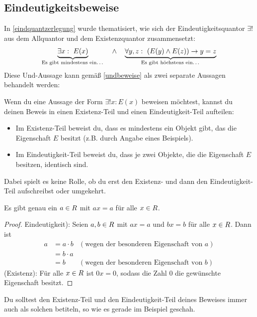 \subsection*{Eindeutigkeitsbeweise}


In \cref{eindquantzerlegung} wurde thematisiert, wie sich der Eindeutigkeitsquantor $\exists !$ aus dem Allquantor und dem Existenzquantor zusammensetzt:
    \[ \underbrace{\exists x:\ E(x)}_{\text{Es gibt mindestens ein\dots}}\quad \land\quad \underbrace{\forall y,z:\ (E(y)\land E(z)) \to y=z}_{\text{Es gibt höchstens ein\dots}}\]
Diese Und-Aussage kann gemäß \cref{undbeweise} als zwei separate Aussagen behandelt werden:


\begin{axiom} \label{eindbeweis} 
    Wenn du eine Aussage der Form $\exists ! x: E(x)$ beweisen möchtest, kannst du deinen Beweis in einen Existenz-Teil und einen Eindeutigkeit-Teil aufteilen:
    \begin{itemize}
        \item Im Existenz-Teil beweist du, dass es mindestens ein Objekt gibt, das die Eigenschaft $E$ besitzt (z.B. durch Angabe eines Beispiels).
        \item Im Eindeutigkeit-Teil beweist du, dass je zwei Objekte, die die Eigenschaft $E$ besitzen, identisch sind.
    \end{itemize}
    Dabei spielt es keine Rolle, ob du erst den Existenz- und dann den Eindeutigkeit-Teil aufschreibst oder umgekehrt.
\end{axiom}


\begin{bsp} \label{bsp:eindbeweis}
    Es gibt genau ein $a\in \relax R$ mit $ax=a$ für alle $x\in \relax R$.
\end{bsp}
\begin{proof}
    Eindeutigkeit): Seien $a,b\in \relax R$ mit $ax=a$ und $bx=b$ für alle $x\in \relax R$. Dann ist
    \begin{align*}
        a & = a\cdot b & (\text{wegen der besonderen Eigenschaft von $a$}) \\
        & = b \cdot a  \\
        & = b & (\text{wegen der besonderen Eigenschaft von $b$})
    \end{align*}
    (Existenz): Für alle $x\in \relax R$ ist $0x=0$, sodass die Zahl $0$ die gewünschte Eigenschaft besitzt.
\end{proof}


\begin{bem}
    Du solltest den Existenz-Teil und den Eindeutigkeit-Teil deines Beweises immer auch als solchen betiteln, so wie es gerade im Beispiel geschah.
\end{bem}


